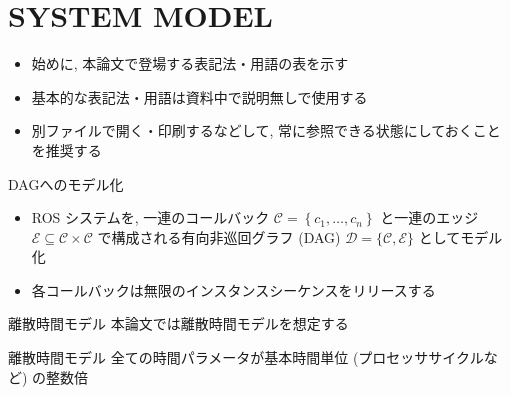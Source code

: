 
\section{SYSTEM MODEL}
\label{sec: system model}


\begin{frame}{}
    \begin{itemize}
        \item 始めに, 本論文で登場する表記法・用語の表を示す
        \item 基本的な表記法・用語は資料中で説明無しで使用する
        \item 別ファイルで開く・印刷するなどして, 常に参照できる状態にしておくことを推奨する
    \end{itemize}
\end{frame}



\begin{frame}{DAGへのモデル化}
    \begin{itemize}
        \item ROS システムを, 一連のコールバック $\mathcal{C}=\left\{c_{1}, \ldots, c_{n}\right\}$ と一連のエッジ $\mathcal{E} \subseteq \mathcal{C} \times \mathcal{C}$ で構成される有向非巡回グラフ (DAG) $\mathcal{D}=\{\mathcal{C}, \mathcal{E}\}$ としてモデル化
        \item 各コールバックは無限のインスタンスシーケンスをリリースする
    \end{itemize}
\end{frame}

\begin{frame}{離散時間モデル}
    本論文では離散時間モデルを想定する
    \begin{block}{離散時間モデル}
        全ての時間パラメータが基本時間単位 (プロセッササイクルなど) の整数倍
    \end{block}
\end{frame}

